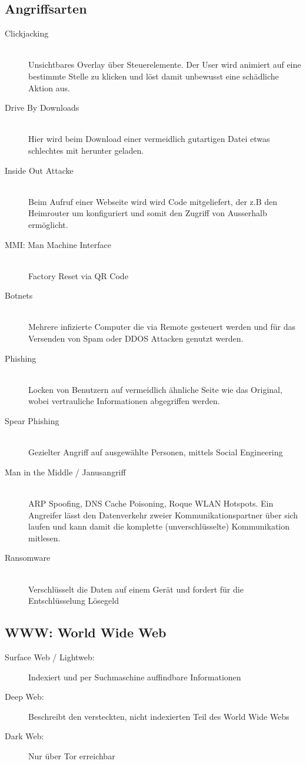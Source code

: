 \subsection{Angriffsarten}
\begin{description}
	\item[Clickjacking] \hfill \\ Unsichtbares Overlay über Steuerelemente. Der User wird animiert auf eine bestimmte Stelle zu klicken und löst damit unbewusst eine schädliche Aktion aus.
	\item[Drive By Downloads] \hfill \\ Hier wird beim Download einer vermeidlich gutartigen Datei etwas schlechtes mit herunter geladen. 
	\item[Inside Out Attacke] \hfill \\ Beim Aufruf einer Webseite wird wird Code mitgeliefert, der z.B den Heimrouter um konfiguriert und somit den Zugriff von Ausserhalb ermöglicht.
	\item[MMI: Man Machine Interface] \hfill \\ Factory Reset via QR Code
	\item[Botnets] \hfill \\ Mehrere infizierte Computer die via Remote gesteuert werden und für das Versenden von Spam oder DDOS Attacken genutzt werden.
	\item[Phishing] \hfill \\ Locken von Benutzern auf vermeidlich ähnliche Seite wie das Original, wobei vertrauliche Informationen abgegriffen werden.
	\item[Spear Phishing] \hfill \\ Gezielter Angriff auf ausgewählte Personen, mittels Social Engineering
	\item[Man in the Middle / Janusangriff] \hfill \\ ARP Spoofing, DNS Cache Poisoning, Roque WLAN Hotspots. Ein Angreifer lässt den Datenverkehr zweier Kommunikationspartner über sich laufen und kann damit die komplette (unverschlüsselte) Kommunikation mitlesen.
	\item[Ransomware] \hfill \\ Verschlüsselt die Daten auf einem Gerät und fordert für die Entschlüsselung Lösegeld
\end{description}

\subsection{WWW: World Wide Web}
\begin{description}
	\item[Surface Web / Lightweb:] Indexiert und per Suchmaschine auffindbare Informationen
	\item[Deep Web:] Beschreibt den versteckten, nicht indexierten Teil des World Wide Webs
	\item[Dark Web:] Nur über Tor erreichbar
\end{description}


